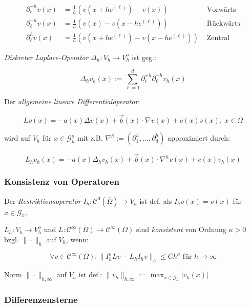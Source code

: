 \vspace*{-4mm}
\begin{align*}
\partial_\ell^{+h} v(x) &= \frac{1}{h} \left( v(x+he^{(\ell)}) - v(x) \right) &\text{ Vorwärts} \\
\partial_\ell^{-h} v(x) &= \frac{1}{h} \left( v(x) - v(x-he^{(\ell)}) \right) &\text{ Rückwärts} \\
\partial_\ell^{h} v(x) &= \frac{1}{h} \left( v(x+he^{(\ell)}) - v(x - he^{(\ell)}) \right) &\text{ Zentral}
\end{align*}

\emph{Diskreter Laplace-Operator} $\Delta_h : V_h \to V_h^o$ ist geg.:

\vspace*{-2mm}
$$\Delta_h v_h(x) := \sum_{\ell = 1}^d \partial_\ell^{+h} \partial_\ell^{-h} v_h(x)$$

Der \emph{allgemeine lineare Differentialoperator}:

\vspace*{-4mm}
$$Lv(x) = -a(x)\Delta v(x) + \vec{b}(x) \cdot \nabla v(x) + c(x)v(x), \ x \in \Omega$$

wird auf $V_h$ für $x \in \mathcal{G}_h^o$ mit z.B. $\nabla^h := \left(\partial_1^h,\dots,\partial_d^h\right)$ approximiert durch:

\vspace*{-4mm}
$$L_h v_h(x) = -a(x)\Delta_h v_h(x) + \vec{b}(x) \cdot \nabla^h v(x) + c(x)v_h(x)$$

\subsubsection*{Konsistenz von Operatoren}

Der \emph{Restriktionsoperator} $I_h : \mathcal{C}^0(\overline\Omega) \to V_h$ ist def. als $I_h v(x) = v(x)$ für $x \in \mathcal{G}_h$. 

\spacing

$L_h : V_h \to V_h^o$ und $L : \mathcal{C}^\infty(\Omega) \to \mathcal{C}^\infty(\Omega)$ sind \emph{konsistent} von Ordnung $\kappa > 0$ bzgl. $\|\cdot\|_h$ auf $V_h$, wenn:

\vspace*{-4mm}
$$\forall v \in \mathcal{C}^\infty(\Omega) : \|I_h^o Lv - L_h I_h v\|_h \leq C h^\kappa \text{ für } h \to \infty$$

Norm $\|\cdot\|_{h,\infty}$ auf $V_h$ ist def.: $\|v_h\|_{h,\infty} := \displaystyle\max_{x \in \mathcal{G}_h} |v_h(x)|$

\subsubsection*{Differenzensterne}
